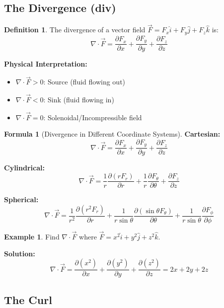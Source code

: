 \documentclass[12pt,a4paper]{article}
\theoremstyle{definition}
\newtheorem{definition}[theorem]{Definition}
\newtheorem{example}[theorem]{Example}
\newtheorem{formula}[theorem]{Formula}
\begin{document}
\subsection{The Divergence (div)}

\begin{definition}
The divergence of a vector field $\vec{F} = F_x\hat{i} + F_y\hat{j} + F_z\hat{k}$ is:
\[
\nabla \cdot \vec{F} = \frac{\partial F_x}{\partial x} + \frac{\partial F_y}{\partial y} + \frac{\partial F_z}{\partial z}
\]
\end{definition}

\begin{importantbox}
\textbf{Physical Interpretation:}
\begin{itemize}
    \item $\nabla \cdot \vec{F} > 0$: Source (fluid flowing out)
    \item $\nabla \cdot \vec{F} < 0$: Sink (fluid flowing in)
    \item $\nabla \cdot \vec{F} = 0$: Solenoidal/Incompressible field
\end{itemize}
\end{importantbox}

\begin{formula}[Divergence in Different Coordinate Systems]
\textbf{Cartesian:}
\[
\nabla \cdot \vec{F} = \frac{\partial F_x}{\partial x} + \frac{\partial F_y}{\partial y} + \frac{\partial F_z}{\partial z}
\]

\textbf{Cylindrical:}
\[
\nabla \cdot \vec{F} = \frac{1}{r}\frac{\partial(rF_r)}{\partial r} + \frac{1}{r}\frac{\partial F_\theta}{\partial\theta} + \frac{\partial F_z}{\partial z}
\]

\textbf{Spherical:}
\[
\nabla \cdot \vec{F} = \frac{1}{r^2}\frac{\partial(r^2F_r)}{\partial r} + \frac{1}{r\sin\theta}\frac{\partial(\sin\theta F_\theta)}{\partial\theta} + \frac{1}{r\sin\theta}\frac{\partial F_\phi}{\partial\phi}
\]
\end{formula}

\begin{example}
Find $\nabla \cdot \vec{F}$ where $\vec{F} = x^2\hat{i} + y^2\hat{j} + z^2\hat{k}$.

\textbf{Solution:}
\[
\nabla \cdot \vec{F} = \frac{\partial(x^2)}{\partial x} + \frac{\partial(y^2)}{\partial y} + \frac{\partial(z^2)}{\partial z} = 2x + 2y + 2z
\]
\end{example}

\subsection{The Curl}
\end{document}
